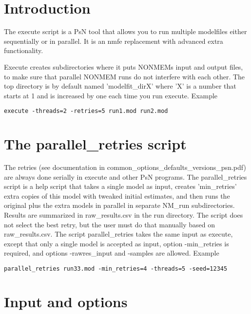 




\maketitle


\section{Introduction}
The execute script is a PsN tool that allows you to run multiple modelfiles either sequentially or in parallel. It is an nmfe replacement with advanced extra
functionality.

Execute creates subdirectories where it puts NONMEMs input and output files, to make sure that parallel NONMEM runs do not interfere with each other.
The top directory is by default named 'modelfit\_dirX' where 'X' is a number that starts at 1 and is increased by one each time you run execute.
Example
\begin{verbatim}
execute -threads=2 -retries=5 run1.mod run2.mod
\end{verbatim}

\section{The parallel\_retries script}
The retries (see documentation in common\_options\_defaults\_versions\_psn.pdf) are always done serially in execute and other PsN programs. The parallel\_retries script is a help script that takes a single model as input, creates 'min\_retries' extra copies of this model with tweaked initial estimates, and then runs the original plus the extra models in parallel in separate NM\_run subdirectories. Results are summarized in raw\_results.csv in the run directory. The script does not select the best retry, but the user must do that manually based on raw\_results.csv. The script parallel\_retries takes the same input as execute, except that only a single model is accepted as input, option -min\_retries is required, and options -rawres\_input and -samples are allowed. 
Example
\begin{verbatim}
parallel_retries run33.mod -min_retries=4 -threads=5 -seed=12345
\end{verbatim}

\section{Input and options}
